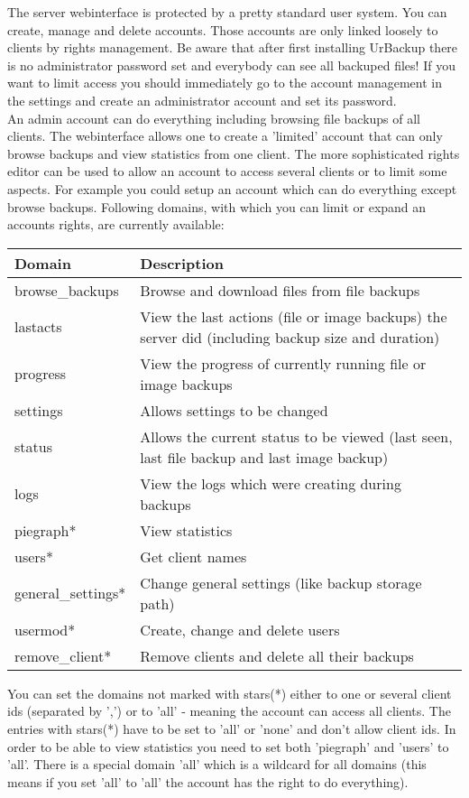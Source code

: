 \documentclass[a4paper,10pt]{article}
\begin{document}
The server webinterface is protected by a pretty standard user system. You can create, manage and delete accounts. Those accounts are only linked loosely to clients by rights management. Be aware that after first installing UrBackup there is no administrator password set and everybody can see all backuped files! If you want to limit access you should immediately go to the account management in the settings and create an administrator account and set its password.\\
An admin account can do everything including browsing file backups of all clients. The webinterface allows one to create a 'limited' account that can only browse backups and view statistics from one client. The more sophisticated rights editor can be used to allow an account to access several clients or to limit some aspects. For example you could setup an account which can do everything except browse backups.
Following domains, with which you can limit or expand an accounts rights, are currently available:

\begin{tabular}{|l|p{}|}
\hline
Domain  & Description \\
\hline\hline
browse\_backups & Browse and download files from file backups\\
lastacts & View the last actions (file or image backups) the server did (including backup size and duration)\\
progress & View the progress of currently running file or image backups\\
settings & Allows settings to be changed\\
status & Allows the current status to be viewed (last seen, last file backup and last image backup)\\
logs & View the logs which were creating during backups\\
piegraph* & View statistics\\
users* & Get client names\\
general\_settings* & Change general settings (like backup storage path)\\
usermod* & Create, change and delete users\\
remove\_client* & Remove clients and delete all their backups\\
\hline
\end{tabular}

You can set the domains not marked with stars(*) either to one or several client ids (separated by ',') or to 'all' - meaning the account can access all clients. The entries with stars(*) have to be set to 'all' or 'none' and don't allow client ids. In order to be able to view statistics you need to set both 'piegraph' and 'users' to 'all'. There is a special domain 'all' which is a wildcard for all domains (this means if you set 'all' to 'all' the account has the right to do everything). 
\end{document}
